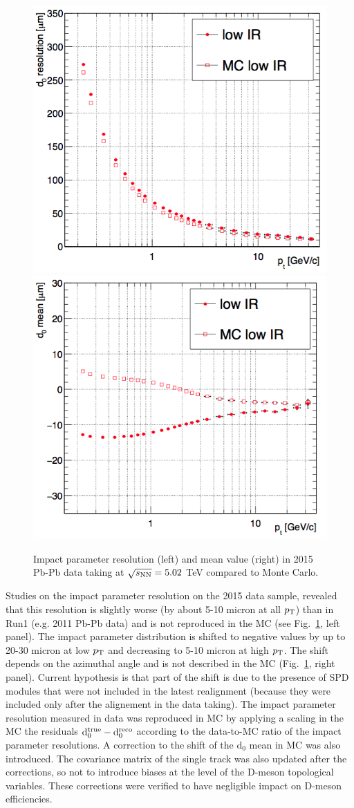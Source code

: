 \begin{figure}[!htb]
 \begin{center}
\includegraphics[width=.49\textwidth]{./FigCap5/d0Reso.png}
\includegraphics[width=.49\textwidth]{./FigCap5/d0Mean.png}
\end{center}
 \caption{Impact parameter resolution (left) and mean value (right) in 2015 Pb-Pb data taking at $\sqrt{s_{\rm NN}} = 5.02$ TeV compared to Monte Carlo.}
 \label{fig:d0}
\end{figure}
Studies on the impact parameter resolution on the 
2015 data sample, revealed that this resolution is 
slightly worse (by about 5-10 micron at all $p_{\rm T}$) 
than in Run1 (e.g. 2011 Pb-Pb data) and is not reproduced
in the MC (see Fig.~\ref{fig:d0}, left panel).
The impact parameter distribution is shifted to negative 
values by up to 20-30 micron at low $p_{\rm T}$ and 
decreasing to 5-10 micron at high $p_{\rm T}$. The shift 
depends on the azimuthal angle and is not described 
in the MC (Fig.~\ref{fig:d0}, right panel). Current hypothesis is that part of the shift 
is due to the presence of SPD modules that were not 
included in the latest realignment (because they were
 included only after the alignement in the data taking). 
 The impact parameter resolution measured in data 
 was reproduced in MC by applying a scaling in the 
 MC the residuals ${\rm d}_0^{\rm true}-{\rm d}_0^{\rm reco}$ 
 according to the data-to-MC ratio of the impact parameter 
 resolutions. A correction to the shift of the d$_0$ mean in MC was 
 also introduced. The covariance matrix of the single track was also
 updated after the corrections, so not to introduce biases at the level
 of the D-meson topological variables. These corrections were verified
 to have negligible impact on D-meson efficiencies.\\
 


